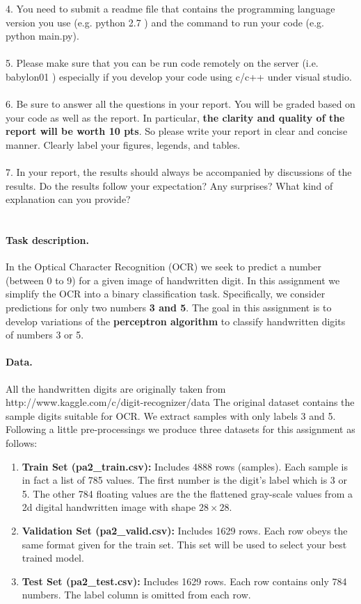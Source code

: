 \documentclass{article}
\begin{document}
{4. You need to submit a readme file that contains the programming language version you use (e.g. python 2.7 ) and the command to run your code (e.g. python main.py).\\\\
{5. Please make sure that you can be run code remotely on  the server (i.e. babylon01 ) especially if you develop your code using c/c++ under visual studio. }\\\\
6. Be sure to answer all the questions in your report. You will be graded based on your code as well as the report. In particular, \textbf{the clarity and quality of the report will be worth 10 pts}. So please write your report in clear and concise manner. Clearly label your figures, legends, and tables.\\\\
7. In your report, the results should always be accompanied by discussions of the results. Do the results follow your expectation? Any surprises? What kind of explanation can you provide? \\
\newpage
{}\\
\paragraph{Task description.} In the Optical Character Recognition (OCR) we seek to predict a number (between 0 to 9) for a given image of handwritten digit. In this assignment we simplify the OCR into a binary classification task. Specifically, we consider predictions for only two numbers \textbf{3 and 5}. The goal in this assignment is to develop variations of the \textbf{perceptron algorithm} to classify handwritten digits of numbers 3 or 5.
\paragraph{Data.} All the handwritten digits are originally taken from
http://www.kaggle.com/c/digit-recognizer/data
The original dataset contains the sample digits suitable for OCR. We extract samples with only labels 3 and 5. Following a little pre-processings we produce three datasets for this assignment as follows:\\
\begin{enumerate}
\item  \textbf{Train Set (pa2\_train.csv):} Includes 4888 rows (samples). Each sample is in fact a list of 785 values. The first number is the digit's label which is 3 or 5. The other 784 floating values are the the flattened gray-scale values from a 2d digital handwritten image with shape $28 \times 28$.
\item \textbf{Validation Set (pa2\_valid.csv):} Includes 1629 rows. Each row obeys the same format given for the train set. This set will be used to select your best trained model.
\item \textbf{Test Set (pa2\_test.csv):} Includes  1629 rows. Each row contains only 784 numbers. The label column is omitted from each row.
\end{enumerate}
}
\end{document}
